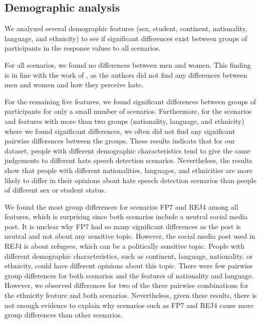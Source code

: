 \subsection{Demographic analysis}
\label{sec:discussion-demographic}
We analyzed several demographic features (sex, student, continent, nationality, language, and ethnicity) to see if significant differences exist between groups of participants in the response values to all scenarios.
%

%
For all scenarios, we found no differences between men and women.
%
This finding is in line with the work of \citet{gold2018women}, as the authors did not find any differences between men and women and how they perceive hate.
%

%
For the remaining five features, we found significant differences between groups of participants for only a small number of scenarios.
%
Furthermore, for the scenarios and features with more than two groups (nationality, language, and ethnicity) where we found significant differences, we often did not find any significant pairwise differences between the groups.
%
These results indicate that for our dataset, people with different demographic characteristics tend to give the same judgements to different hate speech detection scenarios.
%
Nevertheless, the results show that people with different nationalities, languages, and ethnicities are more likely to differ in their opinions about hate speech detection scenarios than people of different sex or student status.
%


%
We found the most group differences for scenarios FP7 and REJ4 among all features, which is surprising since both scenarios include a neutral social media post.
%
It is unclear why FP7 had so many significant differences as the post is neutral and not about any sensitive topic.
%
However, the social media post used in REJ4 is about refugees, which can be a politically sensitive topic.
%
People with different demographic characteristics, such as continent, language, nationality, or ethnicity, could have different opinions about this topic.
%
There were few pairwise group differences for both scenarios and the features of nationality and language.
%
However, we observed differences for two of the three pairwise combinations for the ethnicity feature and both scenarios.
%
Nevertheless, given these results, there is not enough evidence to explain why scenarios such as FP7 and REJ4 cause more group differences than other scenarios.
%

